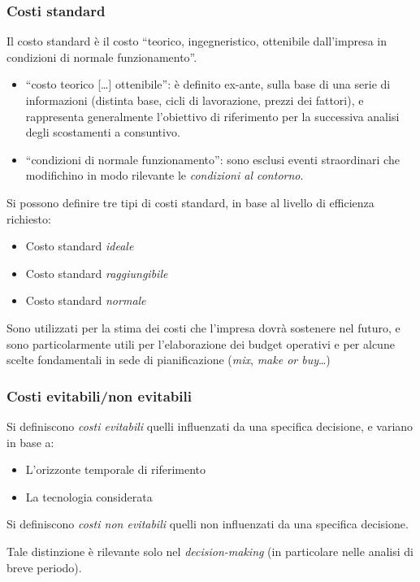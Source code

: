 \subsubsection{Costi standard}
Il costo standard è il costo ``teorico, ingegneristico, ottenibile dall’impresa in condizioni
di normale funzionamento''.

\begin{itemize}
    \item ``costo teorico [\dots] ottenibile'': è definito ex-ante, sulla base di una serie di
    informazioni (distinta base, cicli di lavorazione, prezzi dei fattori), e rappresenta
    generalmente l’obiettivo di riferimento per la successiva analisi degli scostamenti
    a consuntivo.
    \item ``condizioni di normale funzionamento'': sono esclusi eventi straordinari che
    modifichino in modo rilevante le \emph{condizioni al contorno}.
\end{itemize}

Si possono definire tre tipi di costi standard, in base al livello di efficienza richiesto:
\begin{itemize}
    \item Costo standard \emph{ideale}
    \item Costo standard \emph{raggiungibile}
    \item Costo standard \emph{normale}
\end{itemize}

Sono utilizzati per la stima dei costi che l’impresa
dovrà sostenere nel futuro, e sono particolarmente utili per l’elaborazione dei budget
operativi e per alcune scelte fondamentali in sede di pianificazione (\emph{mix}, \emph{make or buy}\dots)

\subsubsection{Costi evitabili/non evitabili}
Si definiscono \emph{costi evitabili} quelli influenzati da una specifica decisione, e variano in base a:
\begin{itemize}
    \item L'orizzonte temporale di riferimento
    \item La tecnologia considerata 
\end{itemize}

Si definiscono \emph{costi non evitabili} quelli non influenzati da una specifica decisione.

Tale distinzione è rilevante solo nel \emph{decision-making} (in particolare nelle analisi di
breve periodo).


